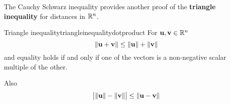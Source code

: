 The Cauchy Schwarz inequality provides another proof of the \textbf{triangle
inequality} for
distances in $\mathbb{R}^{n}$.

\begin{theorem}{Triangle inequality}{triangleinequalitydotproduct}
  For ${\bf u},{\bf v}\in \mathbb{R}^{n}$
\begin{equation}
\| {\bf u}+{\bf v}\| \leq \| {\bf u}\| +\| {\bf v}
\|  \label{triangleineq1}
\end{equation}
and equality holds if and only if one of the vectors is a non-negative scalar
multiple of the other. 

Also
\begin{equation}
\big| \| {\bf u}\| -\| {\bf v}\| \big| \leq
\| {\bf u}-{\bf v}\|  \label{triangleineq2}
\end{equation}
\end{theorem}

